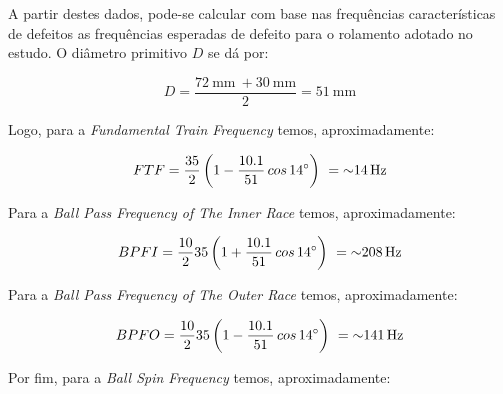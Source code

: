 \documentclass[
	12pt,				
	oneside,			
	a4paper,			
	english,			
	brazil,			
	]{abntex2ppgsi}
\begin{document}
 
\section{}

A partir destes dados, pode-se calcular com base nas frequências características de defeitos as frequências esperadas de defeito para o rolamento adotado no estudo. O diâmetro primitivo $D$ se dá por: 

\begin{equation}
	D = \frac{\SI{72}{\mm} \ + \SI{30}{\mm}}{2} = \SI{51}{\mm}
	\label{eq: Diametro Primitivo no Rolamento}
\end{equation}



Logo, para a \textit{Fundamental Train Frequency} temos, aproximadamente:

\begin{equation}
	FTF = \frac{35}{2} \left ( 1 - \frac{10.1}{51} \,cos \, \ang{14} \right )  \ = \SI{~14}{{\hertz}}
	\label{eq: FTF no  Rolamento}
\end{equation}


Para a \textit{Ball Pass Frequency of The Inner Race} temos, aproximadamente:

\begin{equation}
	BPFI = \frac{10}{2}35 \left ( 1 + \frac{10.1}{51} \,cos \, \ang{14} \right )  \ = \SI{~208}{{\hertz}}
	\label{eq: BPFI no rolamento}
\end{equation}


Para a \textit{Ball Pass Frequency of The Outer Race} temos, aproximadamente:

\begin{equation}
	BPFO = \frac{10}{2}35 \left ( 1 - \frac{10.1}{51} \,cos \, \ang{14} \right )  \ = \SI{~141}{{\hertz}}
	\label{eq: BPFO no Rolamento}
\end{equation}


Por fim, para a \textit{Ball Spin Frequency} temos, aproximadamente:
\end{document}
